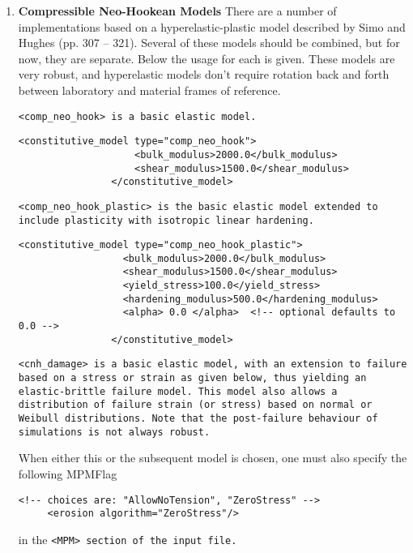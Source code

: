 \begin{enumerate}
\item{\bf Compressible Neo-Hookean Models} There are a number of implementations
based on a hyperelastic-plastic model described by Simo and
Hughes\cite{simo1998} (pp. 307 -- 321).  Several of these models should be 
combined, but for now, they are separate.  Below the usage for each is
given.  These models are very robust, and hyperelastic models don't
require rotation back and forth between laboratory and material frames of
reference.

\tt <comp\_neo\_hook> \normalfont is a basic elastic model.

\begin{Verbatim}[fontsize=\footnotesize]
                <constitutive_model type="comp_neo_hook">
                    <bulk_modulus>2000.0</bulk_modulus>
                    <shear_modulus>1500.0</shear_modulus>
                </constitutive_model>
\end{Verbatim}

\tt <comp\_neo\_hook\_plastic> \normalfont is the basic elastic model extended
to include plasticity with isotropic linear hardening.

\begin{Verbatim}[fontsize=\footnotesize]
                <constitutive_model type="comp_neo_hook_plastic">
                  <bulk_modulus>2000.0</bulk_modulus>
                  <shear_modulus>1500.0</shear_modulus>
                  <yield_stress>100.0</yield_stress>
                  <hardening_modulus>500.0</hardening_modulus>
                  <alpha> 0.0 </alpha>  <!-- optional defaults to 0.0 -->
                </constitutive_model>
\end{Verbatim}

\tt <cnh\_damage> \normalfont is a basic elastic model, with an extension
to failure based on a stress or strain as given below, thus yielding an
elastic-brittle failure model.  This model also allows a distribution
of failure strain (or stress) based on normal or Weibull distributions.
Note that the post-failure behaviour of simulations is not always robust.

When either this or the subsequent model is chosen, one must also specify
the following MPMFlag
\begin{Verbatim}[fontsize=\footnotesize]
     <!-- choices are: "AllowNoTension", "ZeroStress" -->
     <erosion algorithm="ZeroStress"/>
\end{Verbatim}
in the \tt <MPM> \normalfont section of the input file.


\end{enumerate}
